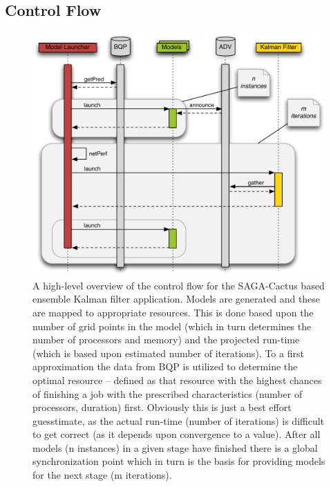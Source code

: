 \documentclass[conference,final]{IEEEtran}
\begin{document}
\subsection{Control Flow}

\begin{figure}
\begin{center}
  \includegraphics[scale=0.5]{./figures/SequenceDiagram}
\end{center}
\caption{A high-level overview of the control flow for the SAGA-Cactus
  based ensemble Kalman filter application. Models are generated and
  these are mapped to appropriate resources. This is done based upon
  the number of grid points in the model (which in turn determines the
  number of processors and memory) and the projected run-time (which
  is based upon estimated number of iterations). To a first
  approximation the data from BQP is utilized to determine the optimal
  resource -- defined as that resource with the highest chances of
  finishing a job with the prescribed characteristics (number of
  processors, duration) first. Obviously this is just a best effort
  guesstimate, as the actual run-time (number of iterations) is
  difficult to get correct (as it depends upon convergence to a
  value). After all models (n instances) in a given stage have
  finished there is a global synchronization point which in turn is
  the basis for providing models for the next stage (m iterations).}
\label{fig:controlflow}
\end{figure}
\end{document}
